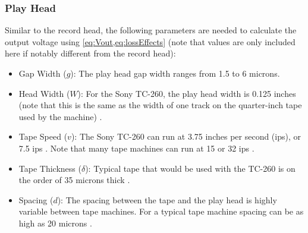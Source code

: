 \documentclass[twoside,a4paper]{article}
\begin{document}
\subsubsection{Play Head}
Similar to the record head, the following parameters
are needed to calculate the output voltage using
\cref{eq:Vout,eq:lossEffects} (note that values are only included
here if notably different from the record head):
\begin{itemize}
\item Gap Width ($g$): The play head gap width ranges from
1.5 to 6 microns\cite{Kadis}.
\item Head Width ($W$): For the Sony TC-260, the play head
width is 0.125 inches (note that this is the same as the
width of one track on the quarter-inch tape used by the 
machine) \cite{RefManual}.
\item Tape Speed ($v$): The Sony TC-260 can run at 3.75 inches
per second (ips), or 7.5 ips \cite{RefManual}. Note that many
 tape machines can run at 15 or 32 ips \cite{Kadis}.
\item Tape Thickness ($\delta$): Typical tape that would be used
with the TC-260 is on the order of 35 microns thick \cite{RefManual}.
\item Spacing ($d$): The spacing between the tape and the play
head is highly variable between tape machines. For a typical
tape machine spacing can be as high as 20 microns \cite{Kadis}.
\end{itemize}
\end{document}
